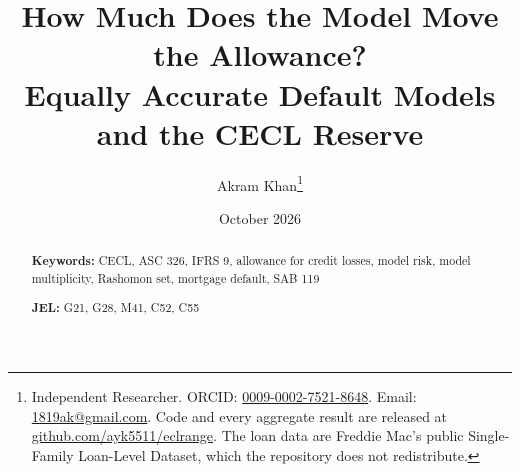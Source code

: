 \documentclass[12pt,a4paper]{article}
\title{How Much Does the Model Move the Allowance?\\
Equally Accurate Default Models and the CECL Reserve}
\author{
  Akram Khan\thanks{Independent Researcher. ORCID:
  \href{https://orcid.org/0009-0002-7521-8648}{0009-0002-7521-8648}. Email:
  \href{mailto:1819ak@gmail.com}{1819ak@gmail.com}. Code and every aggregate
  result are released at
  \href{https://github.com/ayk5511/eclrange}{github.com/ayk5511/eclrange}.
  The loan data are Freddie Mac's public Single-Family Loan-Level Dataset,
  which the repository does not redistribute.}
}
\date{October 2026}
\begin{document}
\maketitle

\begin{abstract}


\medskip
\noindent\textbf{Keywords:} CECL, ASC 326, IFRS 9, allowance for credit losses,
model risk, model multiplicity, Rashomon set, mortgage default, SAB 119

\noindent\textbf{JEL:} G21, G28, M41, C52, C55
\end{abstract}

\newpage
\tableofcontents
\newpage












\appendix

\end{document}
